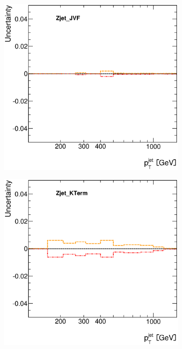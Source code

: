 \documentclass[12pt, twoside]{article}
\numberwithin{equation}{section}
\numberwithin{figure}{section}
\newenvironment{changemargin}[2]{%
\begin{list}{}{%
\setlength{\topsep}{0pt}%
\setlength{\leftmargin}{#1}%
\setlength{\rightmargin}{#2}%
\setlength{\listparindent}{\parindent}%
\setlength{\itemindent}{\parindent}%
\setlength{\parsep}{\parskip}%
}%
\item[]}{\end{list}}
\begin{document}
\begin{figure}[H]
\begin{changemargin}{-1.0cm}{-0.75cm}
\begin{changemargin}{-0.75cm}{-1.0cm}
        \begin{subfigure}[b]{0.25\textwidth}
            \includegraphics[width=\textwidth]{./images/JetSystematics/JetSystematic-45.eps}
        \end{subfigure}
        \begin{subfigure}[b]{0.25\textwidth}
            \includegraphics[width=\textwidth]{./images/JetSystematics/JetSystematic-46.eps}

\end{subfigure}
\end{changemargin}
\end{changemargin}
\end{figure}
\end{document}
